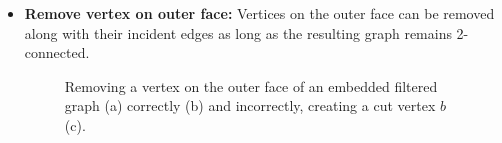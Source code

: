 \begin{itemize}
	\item \textbf{Remove vertex on outer face:} Vertices on the outer face can be removed along with their incident edges as long as the resulting graph remains 2-connected.
\begin{figure}[H]
	\centering
	\quad
	\quad
	\caption{Removing a vertex on the outer face of an embedded filtered graph (a) correctly (b) and incorrectly, creating a cut vertex $b$ (c).}
	\label{fig:transformation}
\end{figure}


\end{itemize}
